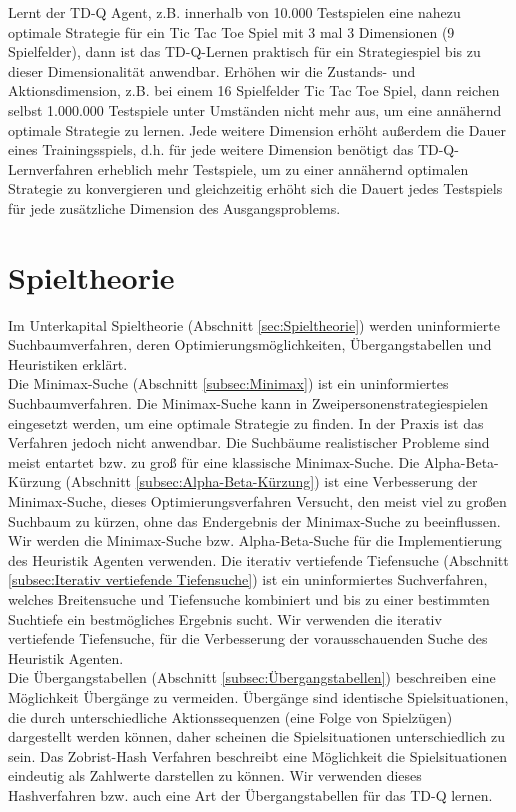 Lernt der TD-Q Agent, z.B. innerhalb von 10.000 Testspielen eine nahezu optimale Strategie für ein Tic Tac Toe Spiel mit 3 mal 3 Dimensionen (9 Spielfelder), dann ist das TD-Q-Lernen praktisch für ein Strategiespiel bis zu dieser Dimensionalität anwendbar. Erhöhen wir die Zustands- und Aktionsdimension, z.B. bei einem 16 Spielfelder Tic Tac Toe Spiel, dann reichen selbst 1.000.000 Testspiele unter Umständen nicht mehr aus, um eine annähernd optimale Strategie zu lernen. Jede weitere Dimension erhöht außerdem die Dauer eines Trainingsspiels, d.h. für jede weitere Dimension benötigt das TD-Q-Lernverfahren erheblich mehr Testspiele, um zu einer annähernd optimalen Strategie zu konvergieren und gleichzeitig erhöht sich die Dauert jedes Testspiels für jede zusätzliche Dimension des Ausgangsproblems.

\section{Spieltheorie}


Im Unterkapital Spieltheorie (Abschnitt \ref{sec:Spieltheorie}) werden uninformierte Suchbaumverfahren, deren Optimierungsmöglichkeiten, Übergangstabellen und Heuristiken erklärt.\\

Die Minimax-Suche (Abschnitt \ref{subsec:Minimax}) ist ein uninformiertes Suchbaumverfahren. Die Minimax-Suche kann in Zweipersonenstrategiespielen eingesetzt werden, um eine optimale Strategie zu finden. In der Praxis ist das Verfahren jedoch nicht anwendbar. Die Suchbäume realistischer Probleme sind meist entartet bzw. zu groß für eine klassische Minimax-Suche. Die Alpha-Beta-Kürzung (Abschnitt \ref{subsec:Alpha-Beta-Kürzung}) ist eine Verbesserung der Minimax-Suche, dieses Optimierungsverfahren Versucht, den meist viel zu großen Suchbaum zu kürzen, ohne das Endergebnis der Minimax-Suche zu beeinflussen. Wir werden die Minimax-Suche bzw. Alpha-Beta-Suche für die Implementierung des Heuristik Agenten verwenden. Die iterativ vertiefende Tiefensuche (Abschnitt \ref{subsec:Iterativ vertiefende Tiefensuche}) ist ein uninformiertes Suchverfahren, welches Breitensuche und Tiefensuche kombiniert und bis zu einer bestimmten Suchtiefe ein bestmögliches Ergebnis sucht. Wir verwenden die iterativ vertiefende Tiefensuche, für die Verbesserung der vorausschauenden Suche des Heuristik Agenten. \\

Die Übergangstabellen (Abschnitt \ref{subsec:Übergangstabellen}) beschreiben eine Möglichkeit Übergänge zu vermeiden. Übergänge sind identische Spielsituationen, die durch unterschiedliche Aktionssequenzen (eine Folge von Spielzügen) dargestellt werden können, daher scheinen die Spielsituationen unterschiedlich zu sein. Das Zobrist-Hash Verfahren beschreibt eine Möglichkeit die Spielsituationen eindeutig als Zahlwerte darstellen zu können. Wir verwenden dieses Hashverfahren bzw. auch eine Art der Übergangstabellen für das TD-Q lernen. \\

